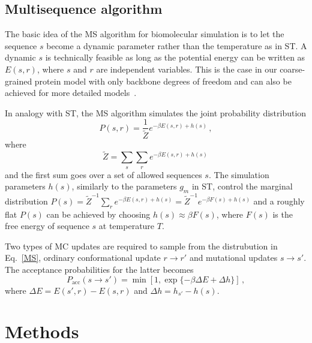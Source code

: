 \documentclass[%
 aip,
rsi,%
 amsmath,amssymb,
 reprint,%
]{revtex4-1}
\newcommand	 {\sbar}	{{s}}
\newcommand	 {\rbar}	{{r}}
\begin{document}
\subsection{Multisequence algorithm}
\noindent 
The basic idea of the MS algorithm for biomolecular simulation is to let the sequence $\sbar$ become a dynamic parameter rather than the temperature as in ST. A dynamic $\sbar$ is technically feasible as long as the potential energy can be written as $E(\sbar,\rbar)$, where $\sbar$ and $\rbar$ are independent variables. This is the case in our coarse-grained protein model with only backbone degrees of freedom and can also be achieved for more detailed  models~\cite{Bhattacherjee2013,Wallin2017}. 

In analogy with ST, the MS algorithm simulates the joint probability distribution
\begin{equation}
P(\sbar,\rbar) =\dfrac{1}{\tilde{Z}}e^{-\beta E(\sbar,\rbar) + h(\sbar)}\,, 
\label{MS}
\end{equation}
where  
\begin{equation}
\tilde{Z} = \sum_{\sbar}\sum_{\rbar} e^{-\beta E(\sbar,\rbar)+ h(\sbar)}\,
\end{equation}
and the first sum goes over a set of allowed sequences $\sbar$. The simulation parameters $h(\sbar)$, similarly to the parameters $g_m$ in ST, control the marginal distribution $P(\sbar)=\tilde{Z}^{-1}\sum_{\rbar} e^{-\beta E(\sbar,\rbar)+ h(\sbar)} = \tilde{Z}^{-1}e^{-\beta F(\sbar)+ h(\sbar)}$ and a roughly flat $P(\sbar)$ can be achieved by choosing $h(\sbar) \approx \beta F(\sbar)$, where $F(\sbar)$ is the free energy of sequence $\sbar$ at temperature $T$. 

Two types of MC updates are required to sample from the distrubution in Eq.~\ref{MS}, ordinary conformational update $\rbar\rightarrow\rbar'$ and mutational updates $\sbar\rightarrow\sbar'$. The acceptance probabilities for the latter  becomes
\begin{equation}
P_\mathrm{acc} (\sbar\rightarrow\sbar') = \min [1, \exp\{-\beta\Delta E+\Delta h\}]\,,
\label{accrej}
\end{equation}
where $\Delta E = E(\sbar',\rbar)-E(\sbar,\rbar)$ and $\Delta h = h_{\sbar'}-h(\sbar)$.

\section{Methods}
\end{document}
